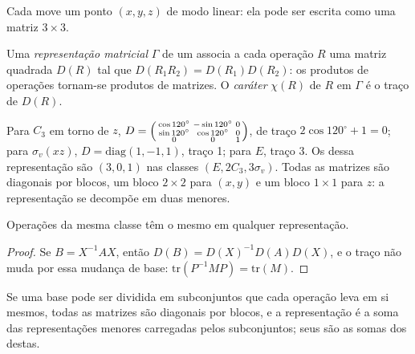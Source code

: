 Cada  move um ponto $(x, y, z)$ de modo linear: ela pode ser
escrita como uma matriz $3\times3$.

\begin{definition}\label{def:b3:point-groups:representation}
Uma \emph{representação matricial} $\Gamma$ de um
 associa a cada operação $R$ uma matriz quadrada $D(R)$ tal que
$D(R_1R_2) = D(R_1)D(R_2)$: os produtos de operações tornam-se produtos de
matrizes. O \emph{caráter} $\chi(R)$ de $R$ em $\Gamma$ é
o traço de $D(R)$.
\end{definition}

\begin{example}[As coordenadas em $C_{3v}$]\label{ex:b3:point-groups:xyz}
Para $C_3$ em torno de $z$, $D = \begin{psmallmatrix}\cos120^\circ & -\sin120^\circ &
0\\ \sin120^\circ & \cos120^\circ & 0\\ 0 & 0 & 1\end{psmallmatrix}$, de traço
$2\cos120^\circ + 1 = 0$; para $\sigma_v(xz)$, $D = \mathrm{diag}(1, -1, 1)$, traço
1; para $E$, traço 3. Os  dessa representação são $(3, 0, 1)$ nas
classes $(E, 2C_3, 3\sigma_v)$. Todas as matrizes são diagonais por blocos, um
bloco $2\times2$ para $(x, y)$ e um bloco $1\times1$ para $z$: a
representação se decompõe em duas menores.
\end{example}

\begin{proposition}\label{prop:b3:point-groups:class-characters}
Operações da mesma classe têm o mesmo  em qualquer representação.
\end{proposition}

\begin{proof}
Se $B = X^{-1}AX$, então $D(B) = D(X)^{-1}D(A)D(X)$, e o traço não muda por
essa mudança de base: $\mathrm{tr}(P^{-1}MP) = \mathrm{tr}(M)$.
\end{proof}

\begin{proposition}\label{prop:b3:point-groups:direct-sum}
Se uma base pode ser dividida em subconjuntos que cada operação leva em si
mesmos, todas as matrizes são diagonais por blocos, e a representação é a
soma das representações menores carregadas pelos subconjuntos; seus
 são as somas dos  destas.
\end{proposition}

